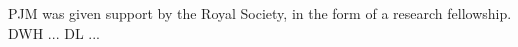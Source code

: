 PJM was given support by the Royal 
Society, in the form of a research fellowship.
%
DWH ...
%
DL ...
%
